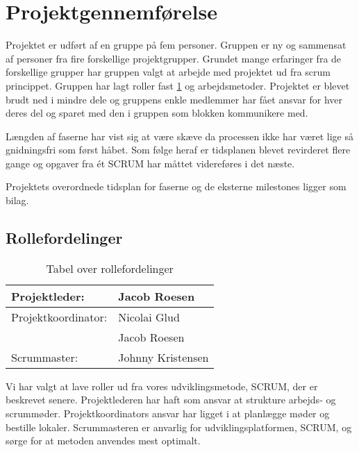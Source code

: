 \section{Projektgennemførelse}
Projektet er udført af en gruppe på fem personer. Gruppen er ny og sammensat af personer fra fire forskellige projektgrupper. Grundet mange erfaringer fra de forskellige grupper har gruppen valgt at arbejde med projektet ud fra scrum princippet. Gruppen har lagt roller fast \ref{table:roller} og arbejdsmetoder. Projektet er blevet brudt ned i mindre dele og gruppens enkle medlemmer har fået ansvar for hver deres del og sparet med den i gruppen som blokken kommunikere med.

Længden af faserne har vist sig at være skæve da processen ikke har været lige så gnidningsfri som først håbet. Som følge heraf er tidsplanen blevet revirderet flere gange og opgaver fra ét SCRUM har måttet videreføres i det næste.

Projektets overordnede tidsplan for faserne og de eksterne milestones ligger som bilag.

\subsection{Rollefordelinger}
\begin{table}[H]
\centering
\begin{tabular}{|l|l|} \hline
Projektleder: &Jacob Roesen\\\hline
Projektkoordinator: &Nicolai Glud\\
	&Jacob Roesen\\\hline
Scrummaster: &Johnny Kristensen\\\hline
\end{tabular}
\caption{Tabel over rollefordelinger}
\label{table:roller}
\end{table}
Vi har valgt at lave roller ud fra vores udviklingsmetode, SCRUM, der er beskrevet senere. Projektlederen har haft som ansvar at strukture arbejds- og scrummøder. Projektkoordinators ansvar har ligget i at planlægge møder og bestille lokaler. Scrummasteren er anvarlig for udviklingsplatformen, SCRUM, og sørge for at metoden anvendes mest optimalt. 
